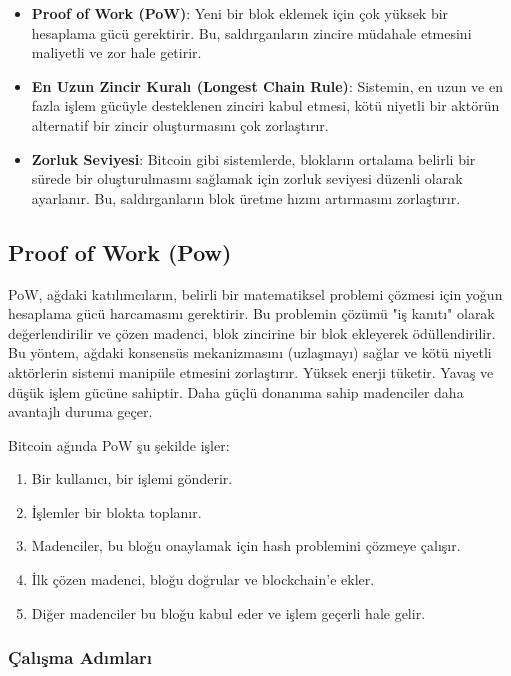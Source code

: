 \begin{itemize}
    \item \textbf{Proof of Work (PoW)}: Yeni bir blok eklemek için çok yüksek bir hesaplama gücü gerektirir. Bu, saldırganların zincire müdahale etmesini maliyetli ve zor hale getirir.
    \item \textbf{En Uzun Zincir Kuralı (Longest Chain Rule)}: Sistemin, en uzun ve en fazla işlem gücüyle desteklenen zinciri kabul etmesi, kötü niyetli bir aktörün alternatif bir zincir oluşturmasını çok zorlaştırır.
    \item \textbf{Zorluk Seviyesi}: Bitcoin gibi sistemlerde, blokların ortalama belirli bir sürede bir oluşturulmasını sağlamak için zorluk seviyesi düzenli olarak ayarlanır. Bu, saldırganların blok üretme hızını artırmasını zorlaştırır.
\end{itemize}

\newpage

\subsection{Proof of Work (Pow)}

PoW, ağdaki katılımcıların, belirli bir matematiksel problemi çözmesi için yoğun hesaplama gücü harcamasını gerektirir. Bu problemin çözümü "iş kanıtı" olarak değerlendirilir ve çözen madenci, blok zincirine bir blok ekleyerek ödüllendirilir. Bu yöntem, ağdaki konsensüs mekanizmasını (uzlaşmayı) sağlar ve kötü niyetli aktörlerin sistemi manipüle etmesini zorlaştırır. Yüksek enerji tüketir. Yavaş ve düşük işlem gücüne sahiptir. Daha güçlü donanıma sahip madenciler daha avantajlı duruma geçer.

Bitcoin ağında PoW şu şekilde işler:

\begin{enumerate}
    \item Bir kullanıcı, bir işlemi gönderir.
    \item İşlemler bir blokta toplanır.
    \item Madenciler, bu bloğu onaylamak için hash problemini çözmeye çalışır.
    \item İlk çözen madenci, bloğu doğrular ve blockchain'e ekler.
    \item Diğer madenciler bu bloğu kabul eder ve işlem geçerli hale gelir.
\end{enumerate}

\subsubsection{Çalışma Adımları}

